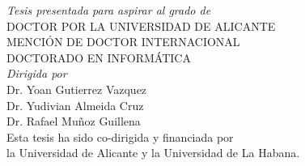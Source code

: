 \begin{titlepage}
{ \it Tesis presentada para aspirar al grado de }\\[.25cm]
{ DOCTOR POR LA UNIVERSIDAD DE ALICANTE }\\[.25cm]
{ MENCI{\'O}N DE DOCTOR INTERNACIONAL }\\[.25cm]
{ DOCTORADO EN INFORM{\'A}TICA }\\[0.5cm]



{ \it Dirigida por }\\[.25cm]
{ Dr. Yoan Gutierrez Vazquez \\ Dr. Yudivian Almeida Cruz \\ Dr. Rafael Muñoz Guillena }\\[1.5cm]



{ Esta tesis ha sido co-dirigida y financiada por\\la Universidad de Alicante y la Universidad de La Habana. }



\vfill %

\end{titlepage}
